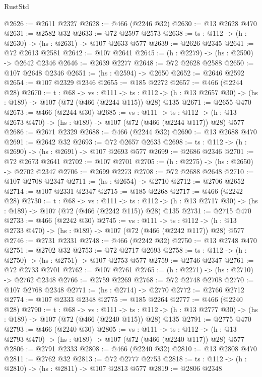 \begin{lexlean}{RustStd}
\begin{coremodule}
@2626 := @2611 @2327
@2628 := @466 (@2246 @32)
@2630 := @13 @2628 @470
@2631 := @2582 @32
@2633 := @72 @2597 @2573
@2638 := {ts : @112} -> (h : @2630) -> (hs : @2631) -> @107 @2633 @577
@2639 := @2626 @2345
@2641 := @72 @2613 @2581
@2642 := @107 @2641
@2645 := (h : @2279) -> (hs : @2590) -> @2642 @2346
@2646 := @2639 @2277
@2648 := @72 @2628 @2588
@2650 := @107 @2648 @2346
@2651 := (hs : @2594) -> @2650
@2652 := @2646 @2592
@2654 := @107 @2329 @2346
@2655 := @185 @2272
@2657 := @466 (@2244 @28)
@2670 := {t : @68} ->
  {vs : @111} ->
  {ts : @112} -> (h : @13 @2657 @30) -> (hs : @189) -> @107 (@72 (@466 (@2244 @115)) @28) @135
@2671 := @2655 @470
@2673 := @466 (@2244 @30)
@2685 := {vs : @111} ->
  {ts : @112} -> (h : @13 @2673 @470) -> (hs : @189) -> @107 (@72 (@466 (@2244 @117)) @28) @577
@2686 := @2671 @2329
@2688 := @466 (@2244 @32)
@2690 := @13 @2688 @470
@2691 := @2642 @32
@2693 := @72 @2657 @2633
@2698 := {ts : @112} -> (h : @2690) -> (hs : @2691) -> @107 @2693 @577
@2699 := @2686 @2346
@2701 := @72 @2673 @2641
@2702 := @107 @2701
@2705 := (h : @2275) -> (hs : @2650) -> @2702 @2347
@2706 := @2699 @2273
@2708 := @72 @2688 @2648
@2710 := @107 @2708 @2347
@2711 := (hs : @2654) -> @2710
@2712 := @2706 @2652
@2714 := @107 @2331 @2347
@2715 := @185 @2268
@2717 := @466 (@2242 @28)
@2730 := {t : @68} ->
  {vs : @111} ->
  {ts : @112} -> (h : @13 @2717 @30) -> (hs : @189) -> @107 (@72 (@466 (@2242 @115)) @28) @135
@2731 := @2715 @470
@2733 := @466 (@2242 @30)
@2745 := {vs : @111} ->
  {ts : @112} -> (h : @13 @2733 @470) -> (hs : @189) -> @107 (@72 (@466 (@2242 @117)) @28) @577
@2746 := @2731 @2331
@2748 := @466 (@2242 @32)
@2750 := @13 @2748 @470
@2751 := @2702 @32
@2753 := @72 @2717 @2693
@2758 := {ts : @112} -> (h : @2750) -> (hs : @2751) -> @107 @2753 @577
@2759 := @2746 @2347
@2761 := @72 @2733 @2701
@2762 := @107 @2761
@2765 := (h : @2271) -> (hs : @2710) -> @2762 @2348
@2766 := @2759 @2269
@2768 := @72 @2748 @2708
@2770 := @107 @2768 @2348
@2771 := (hs : @2714) -> @2770
@2772 := @2766 @2712
@2774 := @107 @2333 @2348
@2775 := @185 @2264
@2777 := @466 (@2240 @28)
@2790 := {t : @68} ->
  {vs : @111} ->
  {ts : @112} -> (h : @13 @2777 @30) -> (hs : @189) -> @107 (@72 (@466 (@2240 @115)) @28) @135
@2791 := @2775 @470
@2793 := @466 (@2240 @30)
@2805 := {vs : @111} ->
  {ts : @112} -> (h : @13 @2793 @470) -> (hs : @189) -> @107 (@72 (@466 (@2240 @117)) @28) @577
@2806 := @2791 @2333
@2808 := @466 (@2240 @32)
@2810 := @13 @2808 @470
@2811 := @2762 @32
@2813 := @72 @2777 @2753
@2818 := {ts : @112} -> (h : @2810) -> (hs : @2811) -> @107 @2813 @577
@2819 := @2806 @2348

\end{coremodule}
\end{lexlean}
